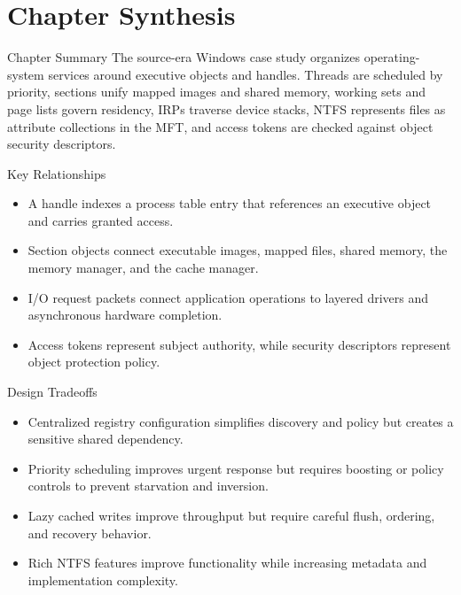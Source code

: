 \documentclass[10pt,letterpaper]{article}
\begin{document}
\section*{Chapter Synthesis}
\begin{studybox}{Chapter Summary}
The source-era Windows case study organizes operating-system services around executive objects and handles. Threads are scheduled by priority, sections unify mapped images and shared memory, working sets and page lists govern residency, IRPs traverse device stacks, NTFS represents files as attribute collections in the MFT, and access tokens are checked against object security descriptors.
\end{studybox}

\begin{studybox}{Key Relationships}
\begin{itemize}
  \item A handle indexes a process table entry that references an executive object and carries granted access.
  \item Section objects connect executable images, mapped files, shared memory, the memory manager, and the cache manager.
  \item I/O request packets connect application operations to layered drivers and asynchronous hardware completion.
  \item Access tokens represent subject authority, while security descriptors represent object protection policy.
\end{itemize}
\end{studybox}

\begin{studybox}{Design Tradeoffs}
\begin{itemize}
  \item Centralized registry configuration simplifies discovery and policy but creates a sensitive shared dependency.
  \item Priority scheduling improves urgent response but requires boosting or policy controls to prevent starvation and inversion.
  \item Lazy cached writes improve throughput but require careful flush, ordering, and recovery behavior.
  \item Rich NTFS features improve functionality while increasing metadata and implementation complexity.
\end{itemize}
\end{studybox}
\end{document}
